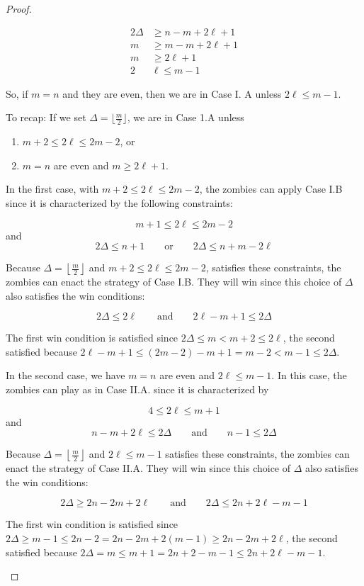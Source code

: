 \begin{proof}
\begin{proofpart}
\begin{align*}
  2 \Delta & \geq n - m + 2\ell + 1 \\
  m & \geq m - m + 2 \ell + 1 \\
  m & \geq 2 \ell + 1 \\
  2 & \ell \leq m -1
\end{align*}

So, if $m = n$ and they are even, then we are in Case I. A unless $2 \ell \leq m -1$.

To recap: If we set $\Delta = \lfloor \frac{m}{2} \rfloor$, we are in Case 1.A unless

\begin{enumerate}
  \item $m+2 \leq 2\ell \leq 2m-2$, or
  \item $m=n$ are even and $m \geq 2\ell +1$.
\end{enumerate}

In the first case, with $m+2 \leq 2\ell \leq 2m-2$, the zombies can apply Case I.B since it is characterized by the following constraints:

\[ m+1 \leq 2 \ell \leq 2m -2 \]
and
\[2 \Delta \leq n +1 \qquad \text{or} \qquad 2\Delta \leq n + m - 2 \ell \]

Because $\Delta  = \left\lfloor \frac{m}{2} \right\rfloor$ and $m+2 \leq 2\ell \leq 2m-2$, satisfies these constraints, the zombies can enact the strategy of Case I.B. They will win since this choice of $\Delta$ also satisfies the win conditions:

\[ 2\Delta \leq 2 \ell \qquad \text{and} \qquad 2\ell -m+1 \leq 2\Delta \]

The first win condition is satisfied since $2\Delta \leq m < m+2 \leq 2\ell$, the second satisfied because $2\ell -m+1 \leq (2m-2)- m+1 = m-2 < m-1 \leq 2\Delta$.

In the second case, we have $m = n$ are even and $2 \ell \leq m -1$. In this case, the zombies can play as in Case II.A. since it is characterized by

\[ 4 \leq 2 \ell \leq m + 1\]
and
\[ n -m + 2\ell \leq 2 \Delta \qquad \text{and} \qquad n-1 \leq 2 \Delta \]

Because $\Delta  = \left\lfloor \frac{m}{2} \right\rfloor$ and $2 \ell \leq m -1$ satisfies these constraints, the zombies can enact the strategy of Case II.A. They will win since this choice of $\Delta$ also satisfies the win conditions:

\[ 2 \Delta \geq 2n - 2m + 2\ell \qquad \text{and} \qquad 2 \Delta \leq 2n + 2\ell - m - 1\]

The first win condition is satisfied since $2\Delta \geq m-1 \leq 2n -2 = 2n-2m+2(m-1) \geq 2n-2m+2\ell$, the second satisfied because $2 \Delta =m \leq m + 1 = 2n+2 -m -1 \leq 2n + 2\ell - m - 1$.

\end{proofpart}
\end{proof}


